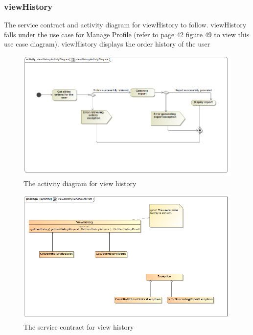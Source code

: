 \documentclass[a4paper,12pt]{report}
\begin{document}
\subsubsection{viewHistory}
The service contract and activity diagram for viewHistory to follow. viewHistory falls under the use case for Manage Profile (refer to page 42 figure 49 to view this use case diagram). viewHistory displays the order history of the user
\begin{figure}[H]
  \centering
    \includegraphics[width=1.0\textwidth]{../images/viewHistoryActivityDiagram.png}
    \caption{The activity diagram for view history} 
\end{figure}

\begin{figure}[H]
	\centering
	\includegraphics[width=1.0\textwidth]{../images/viewHistoryServiceContract.png}
	\caption{The service contract for view history}
\end{figure}
\end{document}
